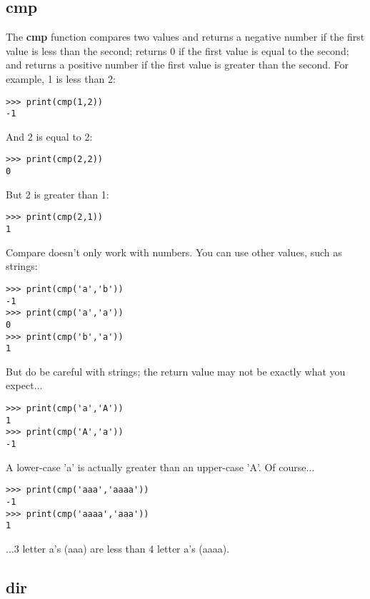 \subsection*{cmp}

The \textbf{cmp} function compares two values and returns a negative number if the first value is less than the second; returns 0 if the first value is equal to the second; and returns a positive number if the first value is greater than the second. For example, 1 is less than 2:

\begin{Verbatim}[frame=single]
>>> print(cmp(1,2))
-1
\end{Verbatim}

\noindent
And 2 is equal to 2:

\begin{Verbatim}[frame=single]
>>> print(cmp(2,2))
0
\end{Verbatim}

\noindent
But 2 is greater than 1:

\begin{Verbatim}[frame=single]
>>> print(cmp(2,1))
1
\end{Verbatim}

\noindent
Compare doesn't only work with numbers. You can use other values, such as strings:

\begin{Verbatim}[frame=single]
>>> print(cmp('a','b'))
-1
>>> print(cmp('a','a'))
0
>>> print(cmp('b','a'))
1
\end{Verbatim}

\noindent
But do be careful with strings; the return value may not be exactly what you expect$\ldots$

\begin{Verbatim}[frame=single]
>>> print(cmp('a','A'))
1
>>> print(cmp('A','a'))
-1
\end{Verbatim}

A lower-case 'a' is actually greater than an upper-case 'A'. Of course$\ldots$

\begin{Verbatim}[frame=single]
>>> print(cmp('aaa','aaaa'))
-1
>>> print(cmp('aaaa','aaa'))
1
\end{Verbatim}

\noindent
$\ldots$3 letter a's (aaa) are less than 4 letter a's (aaaa).

\subsection*{dir}

